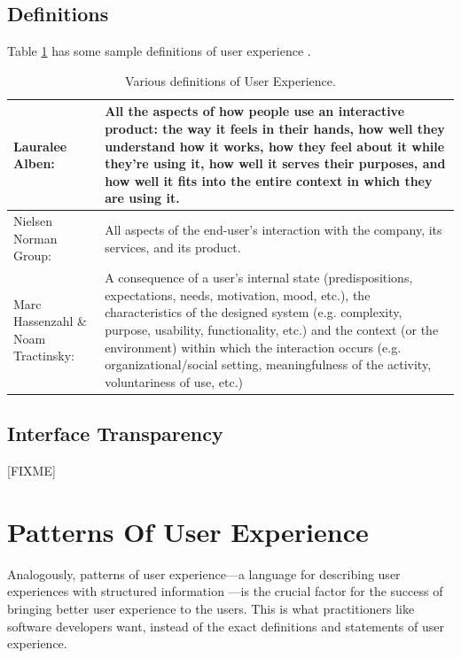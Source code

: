 \documentclass{acm_proc_article-sp}
\begin{document}
\subsection{Definitions}
Table \ref{tab:definitions} has some sample definitions of user
experience \citep{definition:law}.

\begin{table}[!t]
  \caption{Various definitions of User Experience.}
  \label{tab:definitions}
  \begin{center}
    \begin{tabular}{| p{} || p{} |}
      \hline

      Lauralee Alben: & All the aspects of how people use an
      interactive product: the way it feels in their hands, how well
      they understand how it works, how they feel about it while
      they're using it, how well it serves their purposes, and how
      well it fits into the entire context in which they are using
      it. \\ \hline

      Nielsen Norman Group: & All aspects of the end-user's
      interaction with the company, its services, and its
      product. \\ \hline

      Marc Hassenzahl \& Noam Tractinsky: & A consequence of a user's
      internal state (predispositions, expectations, needs,
      motivation, mood, etc.), the characteristics of the designed
      system (e.g. complexity, purpose, usability, functionality,
      etc.) and the context (or the environment) within which the
      interaction occurs (e.g. organizational/social setting,
      meaningfulness of the activity, voluntariness of use, etc.)
      \\ \hline
    \end{tabular}
  \end{center}
\end{table}

\subsection{Interface Transparency}
[FIXME]



\section{Patterns Of User Experience}
\label{sec:pux}
Analogously, patterns of user experience---a language for describing
user experiences with structured information
\citep{pux:blackwell}---is the crucial factor for the success of
bringing better user experience to the users. This is what
practitioners like software developers want, instead of the exact
definitions and statements of user experience.
\end{document}
